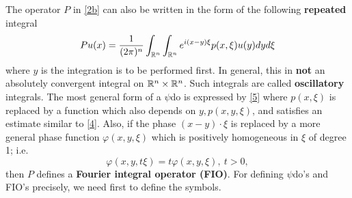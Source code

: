 \documentclass[12pt,reqno]{amsart}
\theoremstyle{plain}  %
\theoremstyle{definition}
\newcommand{\nin}{\noindent}
\newcommand{\vph}{\varphi}
\begin{document}
%
\smallskip
\nin
The operator $ P $ in \eqref{2b} can also be written in the form of the
following {\bf repeated} integral
\begin{equation}
	\begin{split}
		Pu(x) = \frac{1}{(2 \pi)^n} \int_{{\Bbb R^n}} \int_{{\Bbb R^n}} e^{i(x-y)\xi}
p(x, \xi) u(y) dy d \xi 
		\label{5}
	\end{split}
\end{equation}
where $ y $ is the integration is to  be performed first.  In general, this in
{\bf not} an absolutely convergent integral on $ {\Bbb R^n} \times \Bbb
R^n$.  Such integrals are called {\bf oscillatory} integrals.  The most
general form of a $ \psi$do is expressed by \eqref{5} where  $p(x, \xi) $ is
replaced by a function which also depends on $ y, p(x,y, \xi) $, and
satisfies an estimate similar to \eqref{4}.  Also, if the phase $ (x-y)
\cdot \xi $ is replaced by a more general phase function $ \vph (x,
y, \xi) $ which is positively homogeneous in $ \xi $ of degree 1; i.e.
$$\vph(x, y, t \xi) = t \vph (x, y , \xi), \ t > 0,$$ then $ P $ defines a
{\bf Fourier integral operator (FIO)}.
\smallskip
\nin
For defining $ \psi$do's and FIO's precisely, we need first to define
the symbols.
\end{document}

